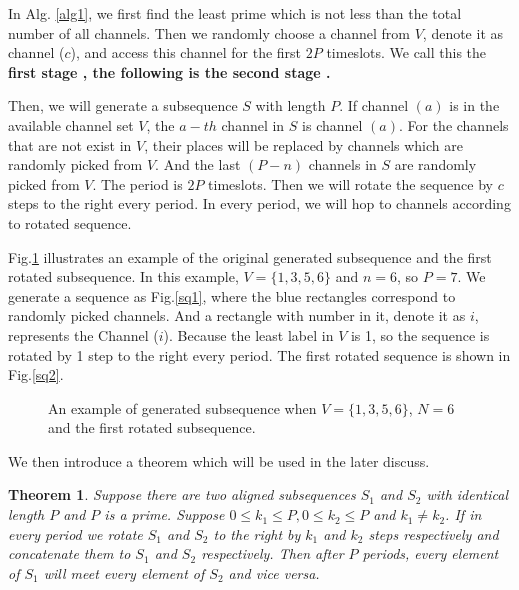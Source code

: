 \documentclass[10pt, conference, letterpaper]{IEEEtran}
\newtheorem{theorem}{Theorem}
\begin{document}
In Alg. \ref{alg1}, we first find the least prime which is not less than the total number of  all channels. Then we randomly choose a channel from $V$, denote it as channel ($c$), and access this channel for the first $2P$ timeslots. We call this the \bfseries first stage \mdseries, the following is the \bfseries second stage \mdseries.

Then, we will generate a subsequence $S$ with length $P$. If channel $(a)$ is in the available channel set $V$, the $a-th$ channel in $S$ is channel $(a)$. For the channels that are not exist in $V$, their places will be replaced by channels which are randomly picked from $V$. And the last $(P-n)$ channels in $S$ are randomly picked from $V$. The period is $2P$ timeslots. Then we will rotate the sequence by $c$ steps to the right every period. In every period, we will hop to channels according to rotated sequence.

Fig.\ref{seq1} illustrates an example of the original generated subsequence and the first rotated subsequence. In this example, $V =\{1,3,5,6\}$ and $n=6$, so $P=7$. We generate a sequence as Fig.\ref{sq1}, where the blue rectangles correspond to randomly picked channels. And a rectangle with number in it, denote it as $i$,  represents the Channel ($i$). Because the least label in $V$ is 1, so the sequence is rotated by 1 step to the right every period. The first rotated sequence is shown in Fig.\ref{sq2}.

\begin{figure}
\centering
{}
\caption{An example of generated subsequence when $V=\{1,3,5,6\}$, $N=6$ and the first rotated subsequence.}
\label{seq1}
\end{figure}


We then introduce a theorem which will be used in the later discuss.

\begin{theorem}
\label{ro-theo}
Suppose there are two aligned subsequences $S_1$ and $S_2$ with identical length $P$ and $P$ is a prime. Suppose $0 \le k_1 \le P, 0 \le k_2 \le P$ and $k_1 \ne k_2$. If in every period we rotate $S_1$ and $S_2$ to the right by $k_1$ and $k_2$ steps respectively and concatenate them to $S_1$ and $S_2$ respectively. Then after $P$ periods, every element of $S_1$ will meet every element of $S_2$ and vice versa.
\end{theorem}
\end{document}
